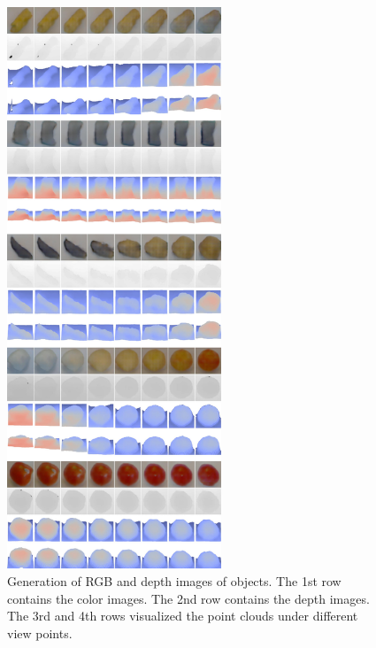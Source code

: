 \begin{figure}[tbh!]
\centering
\includegraphics[trim=0in 0in 0in 0in, width=0.57\textwidth]{result_rgbd_big2.pdf}
\caption{Generation of RGB and depth images of objects. The 1st row contains the color images. The 2nd row contains the depth images. The 3rd and 4th rows visualized the point clouds under different view points.}
\label{fig::result_rgbd2}
\end{figure}

